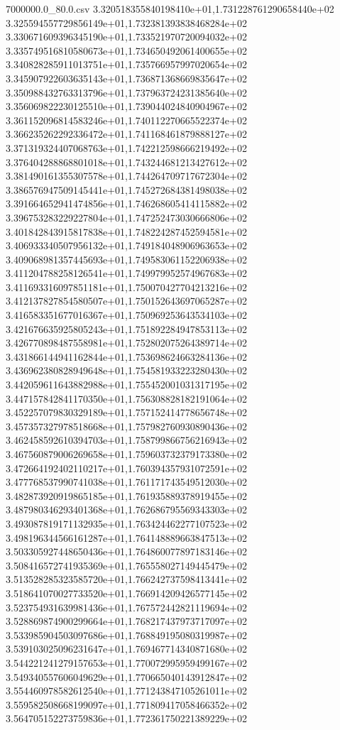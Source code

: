 \begin{filecontents*}{7000000.0_80.0.csv}
3.320518355840198410e+01,1.731228761290658440e+02
3.325594557729856149e+01,1.732381393838468284e+02
3.330671609396345190e+01,1.733521970720094032e+02
3.335749516810580673e+01,1.734650492061400655e+02
3.340828285911013751e+01,1.735766957997020654e+02
3.345907922603635143e+01,1.736871368669835647e+02
3.350988432763313796e+01,1.737963724231385640e+02
3.356069822230125510e+01,1.739044024840904967e+02
3.361152096814583246e+01,1.740112270665522374e+02
3.366235262292336472e+01,1.741168461879888127e+02
3.371319324407068763e+01,1.742212598666219492e+02
3.376404288868801018e+01,1.743244681213427612e+02
3.381490161355307578e+01,1.744264709717672304e+02
3.386576947509145441e+01,1.745272684381498038e+02
3.391664652941474856e+01,1.746268605414115882e+02
3.396753283229227804e+01,1.747252473030666806e+02
3.401842843915817838e+01,1.748224287452594581e+02
3.406933340507956132e+01,1.749184048906963653e+02
3.409068981357445693e+01,1.749583061152206938e+02
3.411204788258126541e+01,1.749979952574967683e+02
3.411693316097851181e+01,1.750070427704213216e+02
3.412137827854580507e+01,1.750152643697065287e+02
3.416583351677016367e+01,1.750969253643534103e+02
3.421676635925805243e+01,1.751892284947853113e+02
3.426770898487558981e+01,1.752802075264389714e+02
3.431866144941162844e+01,1.753698624663284136e+02
3.436962380828949648e+01,1.754581933223280430e+02
3.442059611643882988e+01,1.755452001031317195e+02
3.447157842841170350e+01,1.756308828182191064e+02
3.452257079830329189e+01,1.757152414778656748e+02
3.457357327978518668e+01,1.757982760930890436e+02
3.462458592610394703e+01,1.758799866756216943e+02
3.467560879006269658e+01,1.759603732379173380e+02
3.472664192402110217e+01,1.760394357931072591e+02
3.477768537990741038e+01,1.761171743549512030e+02
3.482873920919865185e+01,1.761935889378919455e+02
3.487980346293401368e+01,1.762686795569343303e+02
3.493087819171132935e+01,1.763424462277107523e+02
3.498196344566161287e+01,1.764148889663847513e+02
3.503305927448650436e+01,1.764860077897183146e+02
3.508416572741935369e+01,1.765558027149445479e+02
3.513528285323585720e+01,1.766242737598413441e+02
3.518641070027733520e+01,1.766914209426577145e+02
3.523754931639981436e+01,1.767572442821119694e+02
3.528869874900299664e+01,1.768217437973717097e+02
3.533985904503097686e+01,1.768849195080319987e+02
3.539103025096231647e+01,1.769467714340871680e+02
3.544221241279157653e+01,1.770072995959499167e+02
3.549340557606049629e+01,1.770665040143912847e+02
3.554460978582612540e+01,1.771243847105261011e+02
3.559582508668199097e+01,1.771809417058466352e+02
3.564705152273759836e+01,1.772361750221389229e+02

\end{filecontents*}
